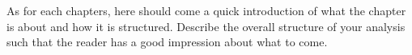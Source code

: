 As for each chapters, here should come a quick introduction of what the chapter is about and how it is structured. Describe the overall structure of your analysis such that the reader has a good impression about what to come. 

